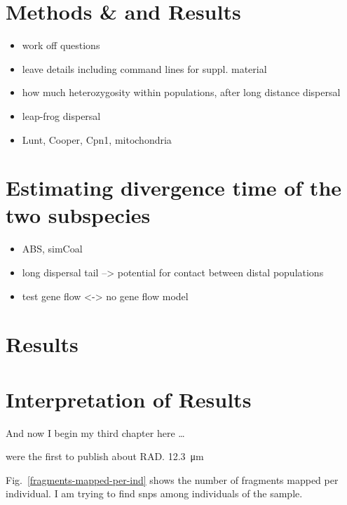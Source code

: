 \documentclass[a4paper,12pt,times,print,index, custombib]{PhDThesisPSnPDF}\usepackage[]{graphicx}\usepackage[]{color}
\begin{document}
\section{Methods \& and Results}

\begin{itemize}
\item work off questions
\item leave details including command lines for suppl. material
\item how much heterozygosity within populations, after long distance dispersal
\item leap-frog dispersal
\item Lunt, Cooper, Cpn1, mitochondria
\end{itemize}



\section{Estimating divergence time of the two subspecies}

\begin{itemize}
\item ABS, simCoal
\item long dispersal tail --> potential for contact between distal populations
\item test gene flow <-> no gene flow model
\end{itemize}


\section{Results}

\section{Interpretation of Results}



And now I begin my third chapter here \dots

\cite{Baird2008} were the first to publish about RAD. \SI{12,3}{\micro\metre}

Fig.~\vref{fragments-mapped-per-ind} shows the number of \glspl{fragment} mapped per individual.
I am trying to find \glspl{snp} among individuals of the sample.
\end{document}
